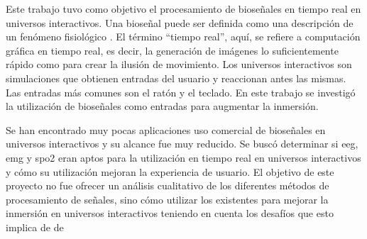 Este trabajo tuvo como objetivo el procesamiento de bioseñales en tiempo real en universos interactivos. Una bioseñal puede ser definida como una descripción de un fenómeno fisiológico \cite{biosignal-book-2}.  El término ``tiempo real'', aquí, se refiere a computación gráfica en tiempo real, es decir, la generación de imágenes lo suficientemente rápido como para crear la ilusión de movimiento. Los universos interactivos son simulaciones que obtienen entradas del usuario y reaccionan antes las mismas. Las entradas más comunes son el ratón y el teclado. En este trabajo se investigó la utilización de bioseñales como entradas para augmentar la inmersión.

Se han encontrado muy pocas aplicaciones uso comercial de bioseñales en universos interactivos y su alcance fue muy reducido. Se buscó determinar si \acrshort{eeg}, \acrshort{emg} y \acrshort{spo2} eran aptos para la utilización en tiempo real en universos interactivos y cómo su utilización mejoran la experiencia de usuario. El objetivo de este proyecto no fue ofrecer un análisis cualitativo de los diferentes métodos de procesamiento de señales, sino cómo utilizar los existentes para mejorar la inmersión en universos interactivos teniendo en cuenta los desafíos que esto implica de de 